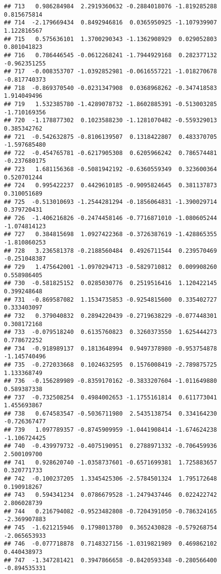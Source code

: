 \documentclass[
]{article}
\begin{document}
\begin{verbatim}
## 713   0.986284984  2.2919360632 -0.2884018076 -1.819285288  0.815675814
## 714  -2.179669434  0.8492946816  0.0365950925 -1.107939907  1.122816567
## 715   0.575636101  1.3700290343 -1.1362908929  0.029052803  0.801041823
## 716   0.786446545 -0.0612268241 -1.7944929168  0.282377132 -0.962351255
## 717  -0.008353707 -1.0392852981 -0.0616557221 -1.018270678 -0.817740373
## 718  -0.869370540 -0.0231347908  0.0368968262 -0.347418583  1.914049496
## 719   1.532385780 -1.4289078732 -1.8602885391 -0.513003285 -1.710169356
## 720  -1.178877302  0.1023588230 -1.1281070482 -0.559329013  0.385342762
## 721  -0.542632875 -0.8106139507  0.1318422807  0.483370705 -1.597685480
## 722  -0.454765781 -0.6217905308  0.6205966242  0.786574481 -0.237680175
## 723   1.681156368 -0.5081942192 -0.6360559349  0.323600364  0.520701244
## 724   0.995422237  0.4429610185 -0.9095824645  0.381137873  0.310051689
## 725  -0.513010693 -1.2544281294 -0.1856064831 -1.390029714  0.379720431
## 726  -1.406216826 -0.2474458146 -0.7716871010 -1.080605244 -1.074814123
## 727   0.384815698  1.0927422368 -0.3726387619 -1.428865355 -1.810860253
## 728   3.236581378 -0.2188560484  0.4926711544  0.239570469 -0.251048387
## 729   1.475642001 -1.0970294713 -0.5829710812  0.009908260  0.558986405
## 730  -0.581825152  0.0285030776  0.2519516416  1.120422145  0.399248648
## 731  -0.869587082  1.1534735853 -0.9254815600  0.335402727  0.333403097
## 732   0.379040832  0.2894220439 -0.2719638229 -0.077448301  0.308172168
## 733  -0.079518240  0.6135760823  0.3260373550  1.625444273  0.778672252
## 734  -0.918989137  0.1813648994  0.9497378980 -0.953754878 -1.145740496
## 735  -0.272033668  0.1024632595  0.1576008419 -2.789875725  1.133368749
## 736  -0.156289989 -0.8359170162 -0.3833207604 -1.011649880  0.589387338
## 737  -0.732508254  0.4984002653 -1.1755161814  0.611773041  1.455693867
## 738   0.674583547 -0.5036711980  2.5435138754  0.334164230 -0.726367477
## 739   1.097789357 -0.8745909959 -1.0441908414 -1.674624238 -1.106724425
## 740  -0.439979732 -0.4075190951  0.2788971332 -0.706459936  2.500109700
## 741   0.928620740 -1.0358737601 -0.6571699381  1.725883657  0.320771733
## 742  -0.100237205  1.3345425306 -2.5784501324  1.795172648  0.190918267
## 743   0.594341234  0.0786679528 -1.2479437446  0.022422742  2.806028739
## 744   0.216794082 -0.9523482808 -0.7204391050 -0.786324165 -2.369907883
## 745  -1.621215946  0.1798013780  0.3652430828 -0.579268754 -2.065653933
## 746  -0.077718878  0.7148327156 -1.0319821989  0.469862102  0.440438973
## 747  -1.347281421  0.3947866658 -0.8420593348 -0.280566400 -0.894535331

\end{verbatim}
\end{document}
